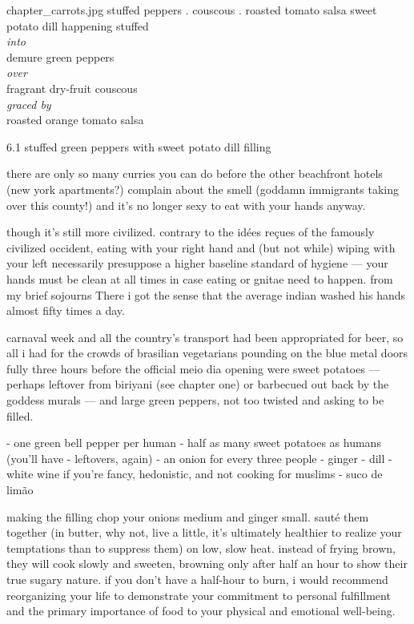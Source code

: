 \mychapter
{chapter_carrots.jpg}
{stuffed peppers . couscous . roasted tomato salsa}
{sweet potato dill happening stuffed\\
\textit{into}\\
demure green peppers\\
\textit{over}\\
fragrant dry-fruit couscous\\
\textit{graced by}\\
roasted orange tomato salsa}

6.1  stuffed green peppers with sweet potato dill filling

there are only so many curries you can do before the other beachfront hotels (new york apartments?) complain about the smell (goddamn immigrants taking over this county!) and it's no longer sexy to eat with your hands anyway.

	though it's still more civilized. contrary to the id\'{e}es re\c{c}ues of the famously civilized occident, eating with your right hand and (but not while) wiping with your left necessarily presuppose a higher baseline standard of hygiene --- your hands must be clean at all times in case eating or gnitae need to happen. from my brief sojourns There i got the sense that the average indian washed his hands almost fifty times a day.

carnaval week and all the country's transport had been appropriated for beer, so all i had for the crowds of brasilian vegetarians pounding on the blue metal doors fully three hours before the official meio dia opening were sweet potatoes --- perhaps leftover from biriyani (see chapter one) or barbecued out back by the goddess murals --- and large green peppers, not too twisted and asking to be filled.

-	one green bell pepper per human
-	half as many sweet potatoes as humans (you'll have -	leftovers, again)
-	an onion for every three people
-	ginger
-	dill
-	white wine if you're fancy, hedonistic, and not cooking for muslims
-	suco de lim\~{a}o

	making the filling
chop your onions medium and ginger small. saut\'{e} them together (in butter, why not, live a little, it's ultimately healthier to realize your temptations than to suppress them) on low, slow heat. instead of frying brown, they will cook slowly and sweeten, browning only after half an hour to show their true sugary nature. if you don't have a half-hour to burn, i would recommend reorganizing your life to demonstrate your commitment to personal fulfillment and the primary importance of food to your physical and emotional well-being.

